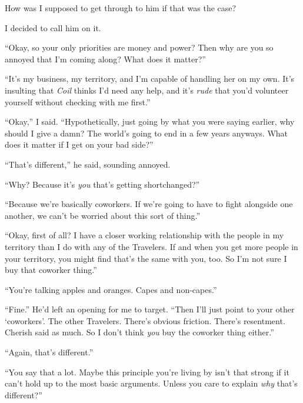 How was I supposed to get through to him if that was the case?



I decided to call him on it.



``Okay, so your only priorities are money and power?  Then why are you so annoyed that I'm coming along?  What does it matter?''



``It's my business, my territory, and I'm capable of handling her on my own.  It's insulting that \emph{Coil} thinks I'd need any help, and it's \emph{rude} that you'd volunteer yourself without checking with me first.''



``Okay,'' I said.  ``Hypothetically, just going by what you were saying earlier, why should I give a damn?  The world's going to end in a few years anyways.  What does it matter if I get on your bad side?''



``That's different,'' he said, sounding annoyed.



``Why?  Because it's \emph{you} that's getting shortchanged?''



``Because we're basically coworkers.  If we're going to have to fight alongside one another, we can't be worried about this sort of thing.''



``Okay, first of all?  I have a closer working relationship with the people in my territory than I do with any of the Travelers.  If and when you get more people in your territory, you might find that's the same with you, too.  So I'm not sure I buy that coworker thing.''



``You're talking apples and oranges.  Capes and non-capes.''



``Fine.''  He'd left an opening for me to target.  ``Then I'll just point to your other `coworkers'.  The other Travelers.  There's obvious friction.  There's resentment.  Cherish said as much.  So I don't think \emph{you} buy the coworker thing either.''



``Again, that's different.''



``You say that a lot.  Maybe this principle you're living by isn't that strong if it can't hold up to the most basic arguments.  Unless you care to explain \emph{why} that's different?''



